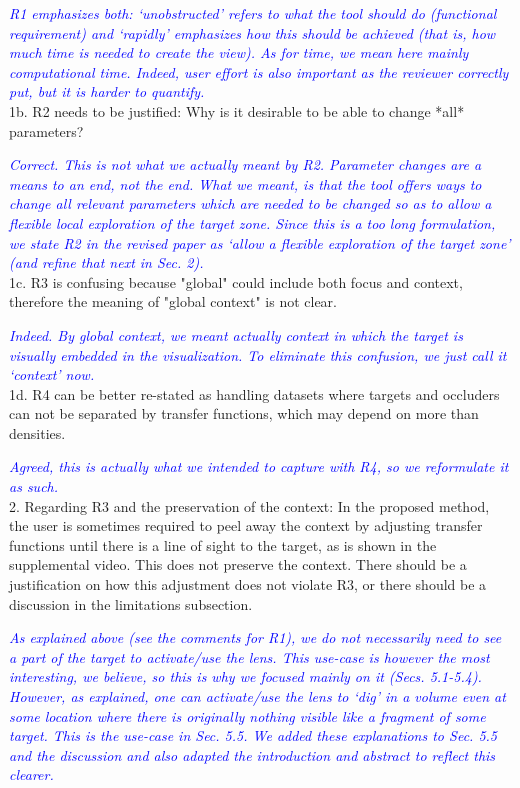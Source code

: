 \documentclass[a4paper,10pt]{article}
\newcommand{\rr}[1]{\emph{\textcolor{blue}{#1}}}
\begin{document}
    \rr{R1 emphasizes both: `unobstructed' refers to what the tool should do (functional requirement) and `rapidly' emphasizes how this should be achieved (that is, how much time is needed to create the view). As for time, we mean here mainly computational time. Indeed, user effort is also important as the reviewer correctly put, but it is harder to quantify.}\\
    
    1b. R2 needs to be justified: Why is it desirable to be able to change *all*
    parameters?
    
    \rr{Correct. This is not what we actually meant by R2. Parameter changes are a means to an end, not the end. What we meant, is that the tool offers ways to change all relevant parameters which are needed to be changed so as to allow a flexible local exploration of the target zone. Since this is a too long formulation, we state R2 in the revised paper as `allow a flexible exploration of the target zone' (and refine that next in Sec. 2).}\\

    1c. R3 is confusing because "global" could include both focus and context,
    therefore the meaning of "global context" is not clear.
    
    \rr{Indeed. By global context, we meant actually context in which the target is visually embedded in the visualization. To eliminate this confusion, we just call it `context' now.}\\

    1d. R4 can be better re-stated as handling datasets where targets and occluders
    can not be separated by transfer functions, which may depend on more than
    densities.

    \rr{Agreed, this is actually what we intended to capture with R4, so we reformulate it as such.}\\

    2. Regarding R3 and the preservation of the context: In the proposed method, the
    user is sometimes required to peel away the context by adjusting transfer
    functions until there is a line of sight to the target, as is shown in the
    supplemental video. This does not preserve the context. There should be a
    justification on how this adjustment does not violate R3, or there should be a
    discussion in the limitations subsection.
    
    \rr{As explained above (see the comments for R1), we do not necessarily need to see a part of the target to activate/use the lens. This use-case is however the most interesting, we believe, so this is why we focused mainly on it (Secs. 5.1-5.4). However, as explained, one can activate/use the lens to `dig' in a volume even at some location where there is originally nothing visible like a fragment of some target. This is the use-case in Sec. 5.5. We added these explanations to Sec. 5.5 and the discussion and also adapted the introduction and abstract to reflect this clearer.}\\
    
\end{document}
